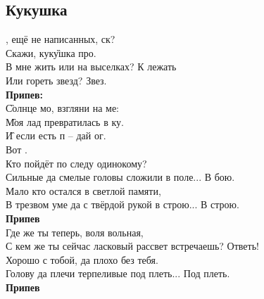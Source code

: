 \documentclass[fleqn,a5paper,12pt,twoside]{guitartabs}
\begin{document}
\subsection*{Кукушка}
    , ещё не написанных, ск?\\
    Скажи, кук\G{ушка}\Dm{,} про.\\
    В  мне жить или на выселках? К лежать\\
    Или гореть звезд? Звез.\\
    
    \-\hspace{10mm}\textbf{Припев:}\\    
    \-\hspace{10mm}\G{Солнце} мо, взгляни на ме:\\
    \-\hspace{10mm}\G{Моя} лад превратилась в ку.\\
    \-\hspace{10mm}\G{И} если есть п -- дай ог.\\
    \-\hspace{10mm}Вот .\\
    
    Кто пойдёт по следу одинокому?\\
    Сильные да смелые головы сложили в поле... В бою.\\
    Мало кто остался в светлой памяти,\\ 
    В трезвом уме да с твёрдой рукой в строю... В строю.\\
    
    \-\hspace{10mm}\textbf{Припев}\\
    
    Где же ты теперь, воля вольная,\\
    С кем же ты сейчас ласковый рассвет встречаешь? Ответь!\\
    Хорошо с тобой, да плохо без тебя.\\
    Голову да плечи терпеливые под плеть... Под плеть.\\
    
    \-\hspace{10mm}\textbf{Припев}
\newpage
{}%
\end{document}
